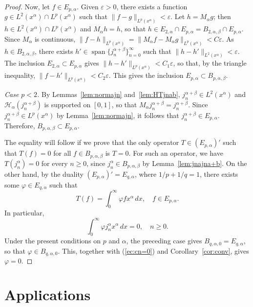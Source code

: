 \documentclass[reqno]{amsart}
\theoremstyle{plain}
\theoremstyle{definition}
\theoremstyle{remark}
\newcommand{\lpnorm}[3]{\|{#1}\|_{L^{#2}({#3})}} %
\newcommand{\spa}{\operatorname{span}} %
\newcommand{\htr}{\mathcal{H}_\alpha} %
\begin{document}
\begin{proof}
Now, let $f\in E_{p,\alpha}$. Given $\varepsilon>0$, there exists a function
$g\in L^2(x^\alpha)\cap L^p(x^\alpha)$ such that
$\lpnorm{f-g}{p}{x^\alpha}<\varepsilon$. Let $h=M_\alpha g$; then $h \in
L^2(x^\alpha)\cap L^p(x^\alpha)$ and $M_\alpha h = h$, so that $h\in
E_{2,\alpha}\cap E_{p,\alpha} = B_{2,\alpha,\beta}\cap E_{p,\alpha}$. Since
$M_\alpha$ is continuous, $\lpnorm{f-h}{p}{x^\alpha} = \lpnorm{M_\alpha
f-M_\alpha g}{p}{x^\alpha} < C\varepsilon$. As $h\in B_{2,\alpha,\beta}$,
there exists $h'\in \spa\{j_n^{\alpha+\beta}\}_{n=0}^\infty$ such that
$\lpnorm{h-h'}{2}{x^\alpha}<\varepsilon$. The inclusion $E_{2,\alpha} \subset
E_{p,\alpha}$ gives $\lpnorm{h-h'}{p}{x^\alpha}< C_1 \varepsilon$, so that, by
the triangle inequality, $\lpnorm{f-h'}{p}{x^\alpha}<C_2\varepsilon$.
This gives the inclusion $E_{p,\alpha}\subset B_{p,\alpha,\beta}$.

{\it Case $p<2$.} By Lemmas~\ref{lem:normajn} and~\ref{lem:HTjnab},
$j_n^{\alpha+\beta} \in L^2(x^\alpha)$ and $\htr(j_n^{\alpha+\beta})$ is
supported on $[0,1]$, so that $M_\alpha j_n^{\alpha+\beta} =
j_n^{\alpha+\beta}$. Since $j_n^{\alpha+\beta} \in L^p(x^\alpha)$ by
Lemma~\ref{lem:normajn}, it follows that $j_n^{\alpha+\beta} \in
E_{p,\alpha}$. Therefore, $B_{p,\alpha,\beta} \subset E_{p,\alpha}$.

The equality will follow if we prove that the only operator $T \in
(E_{p,\alpha})'$ such that $T(f) = 0$ for all $f \in B_{p,\alpha,\beta}$ is $T
= 0$. For such an operator, we have $T(j_n^\alpha) = 0$ for every $n \ge 0$,
since $j_n^\alpha \in B_{p,\alpha,\beta}$ by Lemma~\ref{lem:jnajna+b}. On the
other hand, by the duality $(E_{p,\alpha})'=E_{q,\alpha}$, where $1/p+1/q=1$,
there exists some $\varphi \in E_{q,\alpha}$ such that
\begin{equation*}
    T(f) = \int_0^\infty \varphi f x^\alpha\,dx, \quad f \in E_{p,\alpha}.
\end{equation*}
In particular,
\begin{equation}
\label{ec:cn=0}
   \int_0^\infty \varphi j_n^\alpha x^\alpha \, dx = 0, \quad n \ge 0.
\end{equation}
Under the present conditions on $p$ and $\alpha$, the preceding case
gives $B_{q,\alpha,0} = E_{q,\alpha}$, so that $\varphi \in B_{q,\alpha,0}$.
This, together with (\ref{ec:cn=0}) and Corollary~\ref{cor:conv}, gives
$\varphi = 0$.
\end{proof}

\section{Applications}
\label{sec:applications}
\end{document}
